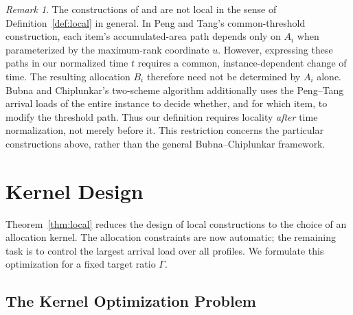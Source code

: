 \documentclass[11pt]{article}
\theoremstyle{definition}
\theoremstyle{remark}
\newtheorem*{remark}{Remark}
\begin{document}
\begin{remark}
The constructions of \citet{PT} and \citet{BC} are not local in the sense of Definition~\ref{def:local} in general.
In Peng and Tang's common-threshold construction, each item's accumulated-area path depends only on $A_i$ when parameterized by the maximum-rank coordinate $u$.
However, expressing these paths in our normalized time $t$ requires a common, instance-dependent change of time.
The resulting allocation $B_i$ therefore need not be determined by $A_i$ alone.
Bubna and Chiplunkar's two-scheme algorithm additionally uses the Peng--Tang arrival loads of the entire instance to decide whether, and for which item, to modify the threshold path.
Thus our definition requires locality \emph{after} time normalization, not merely before it.
This restriction concerns the particular constructions above, rather than the general Bubna--Chiplunkar framework.
\end{remark}

\section{Kernel Design}\label{sec:kernel-design}\label{sec:elementary}

Theorem~\ref{thm:local} reduces the design of local constructions to the choice of an allocation kernel.
The allocation constraints are now automatic; the remaining task is to control the largest arrival load over all profiles.
We formulate this optimization for a fixed target ratio $\Gamma$.

\subsection{The Kernel Optimization Problem}\label{sec:kernel-optimization}
\end{document}
